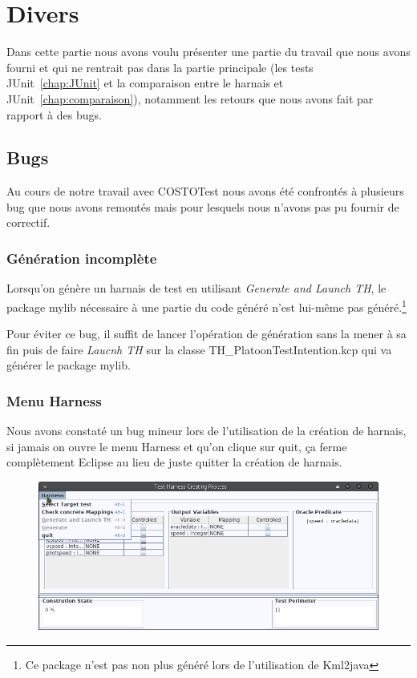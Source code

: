 \chapter{Divers}
\label{chap:divers}

    Dans cette partie nous avons voulu présenter une partie du travail que nous avons fourni et qui ne rentrait pas dans la partie principale (les tests JUnit~\ref{chap:JUnit} et la comparaison entre le harnais et JUnit~\ref{chap:comparaison}), notamment les retours que nous avons fait par rapport à des bugs.

\section{Bugs}
    Au cours de notre travail avec COSTOTest nous avons été confrontés à plusieurs bug que nous avons remontés mais pour lesquels nous n'avons pas pu fournir de correctif.
        
    \subsection*{Génération incomplète}
    Lorsqu'on génère un harnais de test en utilisant \textit{Generate and Launch TH}, le package mylib nécessaire à une partie du code généré n'est lui-même pas généré.\footnote{Ce package n'est pas non plus généré lors de l'utilisation de Kml2java}
    
    Pour éviter ce bug, il suffit de lancer l'opération de génération sans la mener à sa fin puis de faire \textit{Laucnh TH} sur la classe TH\_PlatoonTestIntention.kcp qui va générer le package mylib. 

    \clearpage
    
    \subsection*{Menu Harness}
    Nous avons constaté un bug mineur lors de l'utilisation de la création de harnais, si jamais on ouvre le menu Harness et qu'on clique sur quit, ça ferme complètement Eclipse au lieu de juste quitter la création de harnais.

    \begin{figure}[H]
        \begin{center}
          \includegraphics[scale=0.45]{images/bugquitter.png}
        \end{center}
    \end{figure} 
    
